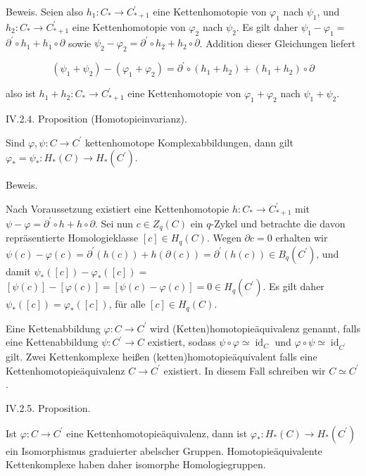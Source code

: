 \documentclass[10pt, letterpaper]{article}
\begin{document}
Beweis. Seien also $h_1: C_* \rightarrow C_{*+1}^{\prime}$ eine Kettenhomotopie von $\varphi_1$ nach $\psi_1$, und $h_2: C_* \rightarrow C_{*+1}^{\prime}$ eine Kettenhomotopie von $\varphi_2$ nach $\psi_2$. Es gilt daher $\psi_1-\varphi_1=$ $\partial^{\prime} \circ h_1+h_1 \circ \partial$ sowie $\psi_2-\varphi_2=\partial^{\prime} \circ h_2+h_2 \circ \partial$. Addition dieser Gleichungen liefert

$$
\left(\psi_1+\psi_2\right)-\left(\varphi_1+\varphi_2\right)=\partial^{\prime} \circ\left(h_1+h_2\right)+\left(h_1+h_2\right) \circ \partial
$$

also ist $h_1+h_2: C_* \rightarrow C_{*+1}^{\prime}$ eine Kettenhomotopie von $\varphi_1+\varphi_2$ nach $\psi_1+\psi_2$.




IV.2.4. Proposition (Homotopieinvarianz). 

Sind $\varphi, \psi: C \rightarrow C^{\prime}$ kettenhomotope Komplexabbildungen, dann gilt $\varphi_*=\psi_*: H_*(C) \rightarrow H_*\left(C^{\prime}\right)$.

Beweis. 


Nach Voraussetzung existiert eine Kettenhomotopie $h: C_* \rightarrow C_{*+1}^{\prime}$ mit $\psi-\varphi=\partial^{\prime} \circ h+h \circ \partial$. Sei nun $c \in Z_q(C)$ ein $q$-Zykel und betrachte die davon repräsentierte Homologieklasse $[c] \in H_q(C)$. Wegen $\partial c=0$ erhalten wir $\psi(c)-\varphi(c)=\partial^{\prime}(h(c))+h(\partial(c))=\partial^{\prime}(h(c)) \in B_q\left(C^{\prime}\right)$, und damit $\psi_*([c])-\varphi_*([c])=$ $[\psi(c)]-[\varphi(c)]=[\psi(c)-\varphi(c)]=0 \in H_q\left(C^{\prime}\right)$. Es gilt daher $\psi_*([c])=\varphi_*([c])$, für alle $[c] \in H_q(C)$.

Eine Kettenabbildung $\varphi: C \rightarrow C^{\prime}$ wird (Ketten)homotopieäquivalenz genannt, falls eine Kettenabbildung $\psi: C^{\prime} \rightarrow C$ existiert, sodass $\psi \circ \varphi \simeq \operatorname{id}_C$ und $\varphi \circ \psi \simeq \operatorname{id}_{C^{\prime}}$ gilt. Zwei Kettenkomplexe heißen (ketten)homotopieäquivalent falls eine Kettenhomotopieäquivalenz $C \rightarrow C^{\prime}$ existiert. In diesem Fall schreiben wir $C \simeq C^{\prime}$.




IV.2.5. Proposition. 


Ist $\varphi: C \rightarrow C^{\prime}$ eine Kettenhomotopieäquivalenz, dann ist $\varphi_*: H_*(C) \rightarrow H_*\left(C^{\prime}\right)$ ein Isomorphismus graduierter abelscher Gruppen. Homotopieäquivalente Kettenkomplexe haben daher isomorphe Homologiegruppen.
\end{document}
